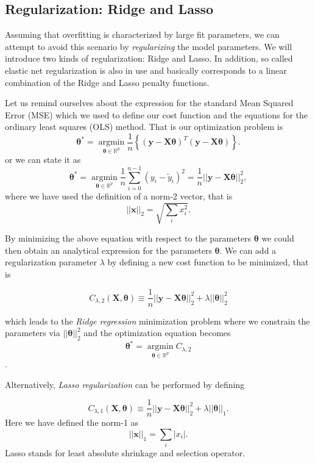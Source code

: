 \documentclass[%
oneside,                 %
final,                   %
10pt]{article}
\begin{document}
\subsection{Regularization: Ridge and Lasso}

Assuming that overfitting is characterized by large fit parameters, we can attempt to avoid this scenario by \emph{regularizing} the model parameters. We will introduce two kinds of regularization: Ridge and Lasso. In addition, so called elastic net regularization is also in use and basically corresponds to a linear combination of the Ridge and Lasso penalty functions.

Let us remind ourselves about the expression for the standard Mean Squared Error (MSE) which we used to define our cost function and the equations for the ordinary least squares (OLS) method. That is our optimization problem is
\[
\bm{\theta}^* = \underset{\bm{\theta}\in {\mathbb{R}}^{p}}{\operatorname{argmin}} \frac{1}{n}\left\{\left(\bm{y}-\bm{X}\bm{	\theta}\right)^T\left(\bm{y}-\bm{X}\bm{\theta}\right)\right\}.
\]
or we can state it as
\[
\bm{\theta}^* = \underset{\bm{\theta}\in {\mathbb{R}}^{p}}{\operatorname{argmin}}
\frac{1}{n}\sum_{i=0}^{n-1}\left(y_i-\tilde{y}_i\right)^2=\frac{1}{n}\vert\vert \bm{y}-\bm{X}\bm{\theta}\vert\vert_2^2,
\]
where we have used the definition of  a norm-2 vector, that is
\[
\vert\vert \bm{x}\vert\vert_2 = \sqrt{\sum_i x_i^2}. 
\]

By minimizing the above equation with respect to the parameters
$\bm{\theta}$ we could then obtain an analytical expression for the
parameters $\bm{\theta}$.  We can add a regularization parameter $\lambda$ by
defining a new cost function to be minimized, that is

\[
C_{\lambda,2} \left( \bm{X}, \bm{\theta} \right) \equiv
\frac{1}{n}\vert\vert \bm{y}-\bm{X}\bm{\theta}\vert\vert_2^2+\lambda\vert\vert \bm{\theta}\vert\vert_2^2 
\]

which leads to the \emph{Ridge regression} minimization problem where we
constrain the parameters via $\vert\vert \bm{\theta}\vert\vert_2^2$ and the optimization equation becomes
\[
\bm{\theta}^* = \underset{\bm{\theta}\in {\mathbb{R}}^{p}}{\operatorname{argmin}}
C_{\lambda,2}
\].

Alternatively, \emph{Lasso regularization} can be performed by defining

\[
C_{\lambda,1} \left( \bm{X},\bm{\theta} \right) \equiv
\frac{1}{n}\vert\vert \bm{y}-\bm{X}\bm{\theta}\vert\vert_2^2+\lambda\vert\vert \bm{\theta}\vert\vert_1.
\]
Here we have defined the norm-1 as 
\[
\vert\vert \bm{x}\vert\vert_1 = \sum_i \vert x_i\vert. 
\]
Lasso stands for least absolute shrinkage and selection operator.
\end{document}
